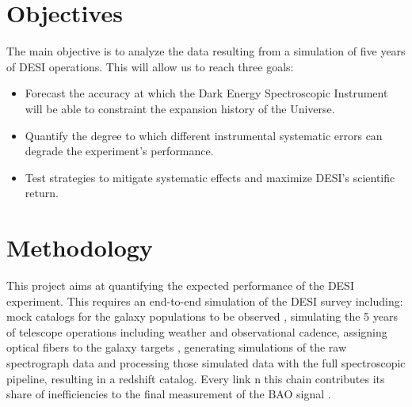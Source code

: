 \documentclass[12pt]{article}
\begin{document}
 




\section*{Objectives}

The main objective is to analyze the data resulting from a simulation
of five years of DESI operations.  
This will allow us to reach three goals:

\begin{itemize}
\item Forecast the accuracy at which the Dark Energy
  Spectroscopic Instrument will be able to constraint the expansion
  history of the Universe.  
\item Quantify the degree to which different instrumental systematic
  errors can degrade the experiment's performance.
\item Test strategies to mitigate systematic effects and maximize
  DESI's scientific return.
\end{itemize}


\section*{Methodology}


This project aims at quantifying the expected performance of the DESI
experiment. 
This requires an end-to-end simulation of the DESI survey including:
mock catalogs for the galaxy populations to be
  observed \cite{2015AAS...22533607S}, simulating the 5 years of
  telescope operations including weather and observational cadence, assigning optical fibers to the
  galaxy targets \cite{2015AAS...22533610C}, generating simulations
  of the raw spectrograph data \cite{2015AAS...22533608E} and
  processing those simulated data with the full spectroscopic pipeline, resulting in a redshift catalog. Every link n this chain
  contributes its share of inefficiencies to the final measurement of
  the BAO signal \cite{2015AAS...22533605E}.
\end{document}
